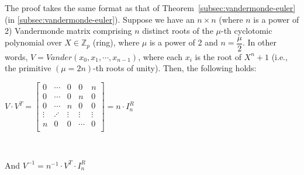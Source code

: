 \begin{tcolorbox}[title={\textbf{\tboxtheorem{\ref*{subsec:vandermonde-euler-integer-ring}} Vandermonde Matrix with Roots of  \text{(power-of-2)}-th Cyclotomic Polynomial over Ring ($\mathbb{Z}_p$)}}]

The proof takes the same format as that of Theorem~\ref*{subsec:vandermonde-euler} (in \autoref{subsec:vandermonde-euler}). Suppose we have an $n \times n$ (where $n$ is a power of 2) Vandermonde matrix comprising $n$ distinct roots of the $\mu$-th cyclotomic polynomial over $X \in \mathbb{Z}_p$ (ring), where $\mu$ is a power of 2 and $n = \dfrac{\mu}{2}$. In other words, $V = \mathit{Vander}(x_0, x_1, \cdots, x_{n-1})$, where each $x_i$ is the root of $X^n + 1$ (i.e., the primitive $(\mu=2n)$-th roots of unity). Then, the following holds:

$V \cdot V^T = \begin{bmatrix}
0 & \cdots & 0 & 0 & n\\
0 & \cdots & 0 & n & 0\\
0 & \cdots & n & 0 & 0\\
\vdots & \iddots & \vdots & \vdots & \vdots \\
n & 0 & 0 & \cdots & 0\\
\end{bmatrix} = n \cdot I^R_n$

$ $

And $V^{-1} = n^{-1}\cdot V^T \cdot I_n^R$


\end{tcolorbox}

